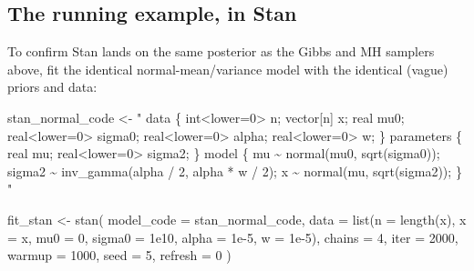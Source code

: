 \documentclass[
  letterpaper,
  DIV=11,
  numbers=noendperiod]{scrreprt}
\newenvironment{Shaded}{\begin{snugshade}}{\end{snugshade}}
\newcommand{\AttributeTok}[1]{\textcolor[rgb]{0.40,0.45,0.13}{#1}}
\newcommand{\DecValTok}[1]{\textcolor[rgb]{0.68,0.00,0.00}{#1}}
\newcommand{\FloatTok}[1]{\textcolor[rgb]{0.68,0.00,0.00}{#1}}
\newcommand{\FunctionTok}[1]{\textcolor[rgb]{0.28,0.35,0.67}{#1}}
\newcommand{\NormalTok}[1]{\textcolor[rgb]{0.00,0.23,0.31}{#1}}
\newcommand{\OtherTok}[1]{\textcolor[rgb]{0.00,0.23,0.31}{#1}}
\newcommand{\StringTok}[1]{\textcolor[rgb]{0.13,0.47,0.30}{#1}}
\begin{document}
\subsection{The running example, in
Stan}\label{the-running-example-in-stan}

To confirm Stan lands on the same posterior as the Gibbs and MH samplers
above, fit the identical normal-mean/variance model with the identical
(vague) priors and data:

\begin{Shaded}
\begin{Highlighting}[]
\NormalTok{stan\_normal\_code }\OtherTok{\textless{}{-}} \StringTok{"}
\StringTok{data \{}
\StringTok{  int\textless{}lower=0\textgreater{} n;}
\StringTok{  vector[n] x;}
\StringTok{  real mu0;}
\StringTok{  real\textless{}lower=0\textgreater{} sigma0;}
\StringTok{  real\textless{}lower=0\textgreater{} alpha;}
\StringTok{  real\textless{}lower=0\textgreater{} w;}
\StringTok{\}}
\StringTok{parameters \{}
\StringTok{  real mu;}
\StringTok{  real\textless{}lower=0\textgreater{} sigma2;}
\StringTok{\}}
\StringTok{model \{}
\StringTok{  mu \textasciitilde{} normal(mu0, sqrt(sigma0));}
\StringTok{  sigma2 \textasciitilde{} inv\_gamma(alpha / 2, alpha * w / 2);}
\StringTok{  x \textasciitilde{} normal(mu, sqrt(sigma2));}
\StringTok{\}}
\StringTok{"}
\end{Highlighting}
\end{Shaded}

\begin{Shaded}
\begin{Highlighting}[]
\NormalTok{fit\_stan }\OtherTok{\textless{}{-}} \FunctionTok{stan}\NormalTok{(}
    \AttributeTok{model\_code =}\NormalTok{ stan\_normal\_code,}
    \AttributeTok{data =} \FunctionTok{list}\NormalTok{(}\AttributeTok{n =} \FunctionTok{length}\NormalTok{(x), }\AttributeTok{x =}\NormalTok{ x, }\AttributeTok{mu0 =} \DecValTok{0}\NormalTok{, }\AttributeTok{sigma0 =} \FloatTok{1e10}\NormalTok{, }\AttributeTok{alpha =} \FloatTok{1e{-}5}\NormalTok{, }\AttributeTok{w =} \FloatTok{1e{-}5}\NormalTok{),}
    \AttributeTok{chains =} \DecValTok{4}\NormalTok{, }\AttributeTok{iter =} \DecValTok{2000}\NormalTok{, }\AttributeTok{warmup =} \DecValTok{1000}\NormalTok{, }\AttributeTok{seed =} \DecValTok{5}\NormalTok{, }\AttributeTok{refresh =} \DecValTok{0}
\NormalTok{)}
\end{Highlighting}
\end{Shaded}
\end{document}
